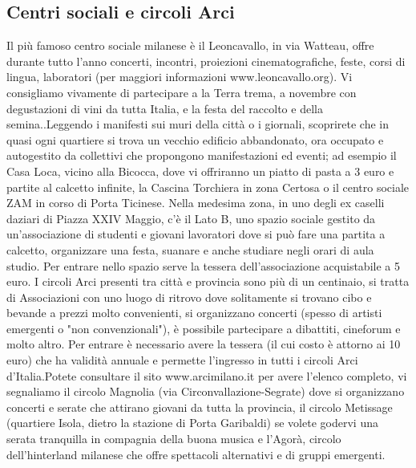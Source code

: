 \subsection{Centri sociali e circoli Arci}
Il più famoso centro sociale milanese è il Leoncavallo, in via Watteau, offre durante tutto l'anno concerti, incontri, proiezioni cinematografiche, feste, corsi di lingua, laboratori (per maggiori informazioni www.leoncavallo.org). Vi consigliamo vivamente di partecipare a la Terra trema, a novembre con degustazioni di vini da tutta Italia, e la festa del raccolto e della semina..Leggendo i manifesti sui muri della città o i giornali, scoprirete che in quasi ogni quartiere si trova un vecchio edificio abbandonato, ora occupato e autogestito da collettivi che propongono manifestazioni ed eventi; ad esempio il Casa Loca, vicino alla Bicocca, dove vi offriranno un piatto di pasta a 3 euro e partite al calcetto infinite, la Cascina Torchiera in zona Certosa o il centro sociale ZAM in corso di Porta Ticinese. Nella medesima zona, in uno degli ex caselli daziari di Piazza XXIV Maggio, c'è il Lato B, uno spazio sociale gestito da un'associazione di studenti e giovani lavoratori dove si può fare una partita a calcetto, organizzare una festa, suanare e anche studiare negli orari di aula studio. Per entrare nello spazio serve la tessera dell'associazione acquistabile a 5 euro.
I circoli Arci presenti tra città e provincia sono più di un centinaio, si tratta di Associazioni con uno luogo di ritrovo dove solitamente si trovano cibo e bevande a prezzi molto convenienti, si organizzano concerti (spesso di artisti emergenti o "non convenzionali"), è possibile partecipare a dibattiti, cineforum e molto altro. 
Per entrare è necessario avere la tessera (il cui costo è attorno ai 10 euro) che ha validità annuale e permette l'ingresso in tutti i circoli Arci d'Italia.Potete consultare il sito www.arcimilano.it per avere l'elenco completo, vi segnaliamo il circolo Magnolia (via Circonvallazione-Segrate) dove si organizzano concerti e serate che attirano giovani da tutta la provincia, il circolo Metissage (quartiere Isola, dietro la stazione di Porta Garibaldi) se volete godervi una serata tranquilla in compagnia della buona musica e l'Agorà, circolo dell'hinterland milanese che offre spettacoli alternativi e di gruppi emergenti.  

